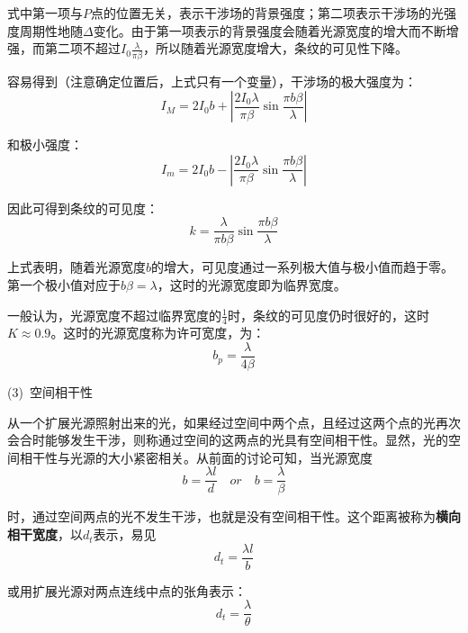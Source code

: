 \documentclass[UTF8]{ctexart}
\begin{document}
	式中第一项与$ P $点的位置无关，表示干涉场的背景强度；第二项表示干涉场的光强度周期性地随$ \Delta $变化。由于第一项表示的背景强度会随着光源宽度的增大而不断增强，而第二项不超过$ I_{0} \frac{\lambda}{\pi \beta} $，所以随着光源宽度增大，条纹的可见性下降。
	
	容易得到（注意确定位置后，上式只有一个变量），干涉场的极大强度为：
	\begin{equation}
	I_{M}=2 I_{0} b+\left|\frac{2 I_{0} \lambda}{\pi \beta} \sin \frac{\pi b \beta}{\lambda}\right| 
	\end{equation}
	
\noindent 和极小强度：
\begin{equation}
I_{m}=2 I_{0} b-\left|\frac{2 I_{0} \lambda}{\pi \beta} \sin \frac{\pi b \beta}{\lambda}\right|
\end{equation}

\noindent 因此可得到条纹的可见度：
\begin{equation}
k=\frac{\lambda}{\pi b \beta} \sin \frac{\pi b \beta}{\lambda}
\end{equation}

	上式表明，随着光源宽度$ b $的增大，可见度通过一系列极大值与极小值而趋于零。第一个极小值对应于$ b \beta =\lambda $，这时的光源宽度即为临界宽度。

	一般认为，光源宽度不超过临界宽度的$ \frac{1}{4} $时，条纹的可见度仍时很好的，这时$ K \approx 0.9 $。这时的光源宽度称为许可宽度，为：
	\begin{equation}
		b_{p}=\frac{\lambda}{4 \beta}
	\end{equation}
	
	(3)\ 空间相干性
	
	从一个扩展光源照射出来的光，如果经过空间中两个点，且经过这两个点的光再次会合时能够发生干涉，则称通过空间的这两点的光具有空间相干性。显然，光的空间相干性与光源的大小紧密相关。从前面的讨论可知，当光源宽度
	\begin{equation}
		b=\frac{\lambda l}{d}\quad or \quad b=\frac{\lambda}{\beta}
	\end{equation}
	
\noindent 时，通过空间两点的光不发生干涉，也就是没有空间相干性。这个距离被称为\textbf{横向相干宽度}，以$ d_{t} $表示，易见
\begin{equation}
	d_{t}= \frac{\lambda l}{b}
\end{equation}

\noindent 或用扩展光源对两点连线中点的张角表示：
\begin{equation}
	d_{t}=\frac{\lambda}{\theta}
\end{equation}
\end{document}
